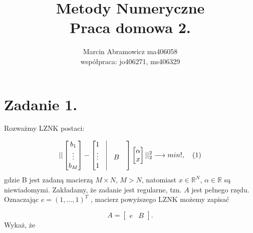 \documentclass[a4paper]{article}
\title{\vspace{-1cm}
Metody Numeryczne \\
\large Praca domowa 2.
}
\author{
Marcin Abramowicz ma406058 \\
\small współpraca: jo406271, ms406329 %
}
\newcommand{\R}{\mathbb R} %
\begin{document}
   \maketitle

   \section*{Zadanie 1.}

      Rozważmy LZNK postaci:

      \[
         ||
         \begin{bmatrix}
            b_{1}  \\
            \vdots \\
            b_{M}  \\
         \end{bmatrix}
         -
         \begin{bmatrix}
            1      & \vline &   & \\
            \vdots & \vline & B & \\
            1      & \vline &   & \\
         \end{bmatrix}
         \begin{bmatrix}
            \alpha \\
            x \\
         \end{bmatrix}
         ||_{2}^{2} \longrightarrow min!, \quad (1)
      \]
      gdzie B jest zadaną macierzą $M \times N$, $M > N$,
      natomiast $x \in \R^{N}$, $\alpha \in \R$ są niewiadomymi.
      Zakładamy, że zadanie jest regularne, tzn. $A$ jest pełnego rzędu.
      Oznaczając $e = (1, \dots, 1)^{T}$ , macierz powyższego LZNK możemy zapisać

      \[
         A =
         \begin{bmatrix}
            e & B
         \end{bmatrix}.
      \]
      Wykaż, że
\end{document}
